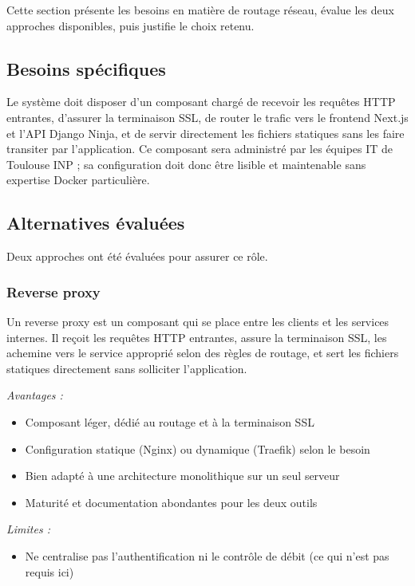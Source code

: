 Cette section présente les besoins en matière de routage réseau,
évalue les deux approches disponibles, puis justifie le choix retenu.

\subsection{Besoins spécifiques}

Le système doit disposer d'un composant chargé de recevoir les
requêtes HTTP entrantes, d'assurer la terminaison SSL, de router
le trafic vers le frontend Next.js et l'API Django Ninja, et de
servir directement les fichiers statiques sans les faire transiter par l'application. Ce composant
sera administré par
les équipes IT de Toulouse INP ; sa configuration doit donc être
lisible et maintenable sans expertise Docker particulière.

\subsection{Alternatives évaluées}

Deux approches ont été évaluées pour assurer ce rôle.

\subsubsection{Reverse proxy}

Un reverse proxy est un composant qui se place entre les clients et
les services internes. Il reçoit les requêtes HTTP entrantes, assure
la terminaison SSL, les achemine vers le service approprié selon des
règles de routage, et sert les fichiers statiques directement sans
solliciter l'application.

\textit{Avantages :}
\begin{itemize}
  \item Composant léger, dédié au routage et à la terminaison SSL
  \item Configuration statique (Nginx) ou dynamique (Traefik) selon
        le besoin
  \item Bien adapté à une architecture monolithique sur un seul serveur
  \item Maturité et documentation abondantes pour les deux outils
\end{itemize}

\textit{Limites :}
\begin{itemize}
  \item Ne centralise pas l'authentification ni le contrôle de débit
        (ce qui n'est pas requis ici)
\end{itemize}

